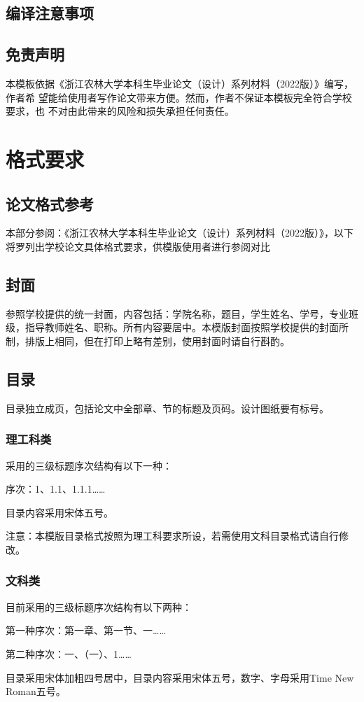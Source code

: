 \documentclass[AutoFakeBold]{ZafuThesis}
\begin{document}
\subsection{编译注意事项}
\subsection{免责声明}
本模板依据《浙江农林大学本科生毕业论文（设计）系列材料（2022版）》编写，作者希 望能给使用者写作论文带来方便。然而，作者不保证本模板完全符合学校要求，也 不对由此带来的风险和损失承担任何责任。
\section{格式要求}
\subsection{论文格式参考}
本部分参阅：《浙江农林大学本科生毕业论文（设计）系列材料（2022版）》，以下将罗列出学校论文具体格式要求，供模版使用者进行参阅对比\par
\subsection{封面}
参照学校提供的统一封面，内容包括：学院名称，题目，学生姓名、学号，专业班级，指导教师姓名、职称。所有内容要居中。本模版封面按照学校提供的封面所制，排版上相同，但在打印上略有差别，使用封面时请自行斟酌。
\subsection{目录}
目录独立成页，包括论文中全部章、节的标题及页码。设计图纸要有标号。
\subsubsection{理工科类}

采用的三级标题序次结构有以下一种：\par
序次：1、1.1、1.1.1……\par
目录内容采用宋体五号。\par
注意：本模版目录格式按照为理工科要求所设，若需使用文科目录格式请自行修改。
\subsubsection{文科类}
目前采用的三级标题序次结构有以下两种：\par
第一种序次：第一章、第一节、一……\par
第二种序次：一、（一）、1……\par
目录采用宋体加粗四号居中，目录内容采用宋体五号，数字、字母采用Time New Roman五号。
\end{document}

